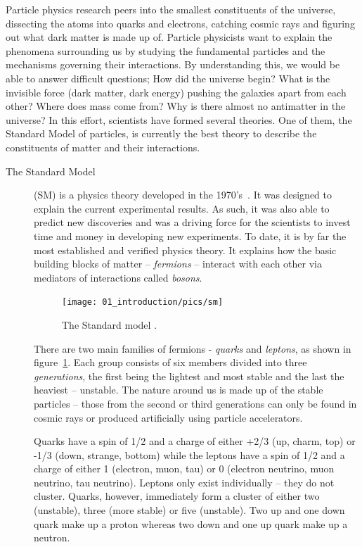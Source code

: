 Particle physics research peers into the smallest constituents of the universe, dissecting the atoms into quarks and electrons, catching cosmic rays and figuring out what dark matter is made up of. Particle physicists want to explain the phenomena surrounding us by studying the fundamental particles and the mechanisms governing their interactions. By understanding this, we would be able to answer difficult questions; How did the universe begin? What is the invisible force (dark matter, dark energy) pushing the galaxies apart from each other? Where does mass come from? Why is there almost no antimatter in the universe? In this effort, scientists have formed several theories. One of them, the Standard Model of particles, is currently the best theory to describe the constituents of matter and their interactions.

\begin{description}
\item[The Standard Model]
(SM) is a physics theory developed in the 1970's~\cite{Novaes:1999yn}. It was designed to explain the current experimental results. As such, it was also able to predict new discoveries and was a driving force for the scientists to invest time and money in developing new experiments. To date, it is by far the most established and verified physics theory. It explains how the basic building blocks of matter -- \emph{fermions} -- interact with each other via mediators of interactions called \emph{bosons}.  
\begin{figure}[!t]
\centering
\texttt{[image: 01\_introduction/pics/sm]}
\caption{The Standard model \cite{Dominguez:2002395}.}
\label{fig:sm}
\end{figure}
There are two main families of fermions - \emph{quarks} and \emph{leptons}, as shown in figure~\ref{fig:sm}. Each group consists of six members divided into three \emph{generations}, the first being the lightest and most stable and the last the heaviest -- unstable. The nature around us is made up of the stable particles -- those from the second or third generations can only be found in cosmic rays or produced artificially using particle accelerators.

Quarks have a spin of 1/2 and a charge of either +2/3 (up, charm, top)  or -1/3  (down, strange, bottom) while the leptons have a spin of 1/2  and a charge of either 1 (electron, muon, tau) or 0 (electron neutrino, muon neutrino, tau neutrino). Leptons only exist individually -- they do not cluster. Quarks, however, immediately form a cluster of either two (unstable), three (more stable) or five (unstable). Two up and one down quark make up a proton whereas two down and one up quark make up a neutron.


\end{description}
